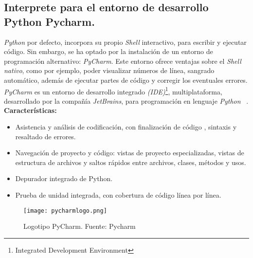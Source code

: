 \subsection{Interprete para el entorno de desarrollo Python Pycharm.}
\emph{Python} por defecto, incorpora su propio \emph{Shell} interactivo, para escribir y ejecutar código. Sin embargo, se ha optado por la instalación de un entorno de programación alternativo: \emph{PyCharm}. Este entorno ofrece ventajas sobre el \emph{Shell nativo}, como por ejemplo, poder visualizar números de línea, sangrado automático, además de ejecutar partes de código y corregir los eventuales errores.
\emph{PyCharm} es un entorno de desarrollo integrado \emph{(IDE)}\footnote{Integrated Development Environment}, multiplataforma, desarrollado por la compañía \emph{JetBrains}, para programación en lenguaje \emph{Python} ~\cite{Pycharm}.\\
\textbf{Características:}
\begin{itemize}
\item Asistencia y análisis de codificación, con finalización de código , sintaxis y resaltado de errores.
\item Navegación de proyecto y código: vistas de proyecto especializadas, vistas de estructura de archivos y saltos rápidos entre archivos, clases, métodos y usos.
\item Depurador integrado de Python.
\item Prueba de unidad integrada, con cobertura de código línea por línea.
\end{itemize}


\begin{figure}[!h]
\begin{center}
\texttt{[image: pycharmlogo.png]}
\caption{Logotipo PyCharm. Fuente: Pycharm ~\cite{Pycharm}}
\label{fig:pycharm}
\end{center}
\end{figure}





